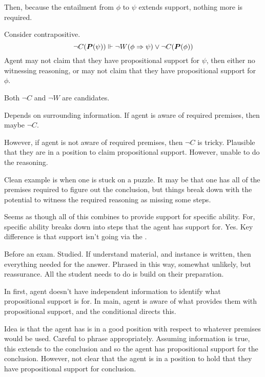 \begin{note}[Contraposing]
  Then, because the entailment from \(\phi\) to \(\psi\) extends support, nothing more is required.

  Consider contrapositive.
  \[\lnot C(\bm{P}(\psi)) \Vdash  \lnot W(\phi \Rightarrow{} \psi) \lor \lnot C(\bm{P}(\phi))\]
  Agent may not claim that they have propositional support for \(\psi\), then either no witnessing reasoning, or may not claim that they have propositional support for \(\phi\).

  Both \(\lnot C\) and \(\lnot W\) are candidates.

  Depends on surrounding information.
  If agent is aware of required premises, then maybe \(\lnot C\).

  However, if agent is not aware of required premises, then \(\lnot C\) is tricky.
  Plausible that they are in a position to claim propositional support.
  However, unable to do the reasoning.

  Clean example is when one is stuck on a puzzle.
  It may be that one has all of the premises required to figure out the conclusion, but things break down with the potential to witness the required reasoning as missing some steps.
\end{note}

\begin{note}
  Seems as though all of this combines to provide support for specific ability.
  For, specific ability breaks down into steps that the agent has support for.
  Yes.
  Key difference is that support isn't going via the \gen{}.
\end{note}

\newpage

\begin{note}
  Before an exam.
  Studied.
  If understand material, and instance is written, then everything needed for the answer.
  Phrased in this way, somewhat unlikely, but reassurance.
  All the student needs to do is build on their preparation.

  In first, agent doesn't have independent information to identify what propositional support is for.
  In main, agent is aware of what provides them with propositional support, and the conditional directs this.
\end{note}

\begin{note}
  Idea is that the agent has is in a good position with respect to whatever premises would be used.
  Careful to phrase appropriately.
  Assuming information is true, this extends to the conclusion and so the agent has propositional support for the conclusion.
  However, not clear that the agent is in a position to hold that they have propositional support for conclusion.
\end{note}

